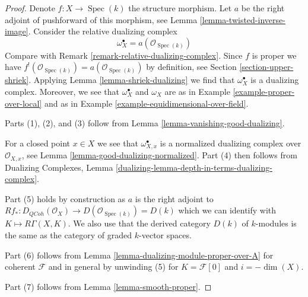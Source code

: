\documentclass[10pt,a4paper]{amsart}
\theoremstyle{plain}
\theoremstyle{definition}
\theoremstyle{remark}
\numberwithin{equation}{subsection}
\def\Spec{\mathop{\mathrm{Spec}}}
\def\QCoh{\mathit{QCoh}}
\begin{document}
\begin{proof}
Denote $f : X \to \Spec(k)$ the structure morphism. Let $a$ be the
right adjoint of pushforward of this morphism, see
Lemma \ref{lemma-twisted-inverse-image}. Consider the relative dualizing
complex
$$
\omega_X^\bullet = a(\mathcal{O}_{\Spec(k)})
$$
Compare with Remark \ref{remark-relative-dualizing-complex}.
Since $f$ is proper we have
$f^!(\mathcal{O}_{\Spec(k)}) = a(\mathcal{O}_{\Spec(k)})$ by
definition, see Section \ref{section-upper-shriek}.
Applying Lemma \ref{lemma-shriek-dualizing} we find that
$\omega_X^\bullet$ is a dualizing complex. Moreover, we see that
$\omega_X^\bullet$ and $\omega_X$ are as in
Example \ref{example-proper-over-local} and as in
Example \ref{example-equidimensional-over-field}.

\medskip\noindent
Parts (1), (2), and (3) follow from
Lemma \ref{lemma-vanishing-good-dualizing}.

\medskip\noindent
For a closed point $x \in X$ we see that $\omega_{X, x}^\bullet$ is a
normalized dualizing complex over $\mathcal{O}_{X, x}$, see
Lemma \ref{lemma-good-dualizing-normalized}.
Part (4) then follows from Dualizing Complexes, Lemma
\ref{dualizing-lemma-depth-in-terms-dualizing-complex}.

\medskip\noindent
Part (5) holds by construction as $a$ is the right adjoint to
$Rf_* : D_\QCoh(\mathcal{O}_X) \to D(\mathcal{O}_{\Spec(k)}) = D(k)$
which we can identify with $K \mapsto R\Gamma(X, K)$. We also use
that the derived category $D(k)$ of $k$-modules is the same as the
category of graded $k$-vector spaces.

\medskip\noindent
Part (6) follows from Lemma \ref{lemma-dualizing-module-proper-over-A}
for coherent $\mathcal{F}$ and in general by unwinding
(5) for $K = \mathcal{F}[0]$ and $i = -\dim(X)$.

\medskip\noindent
Part (7) follows from Lemma \ref{lemma-smooth-proper}.
\end{proof}
\end{document}
